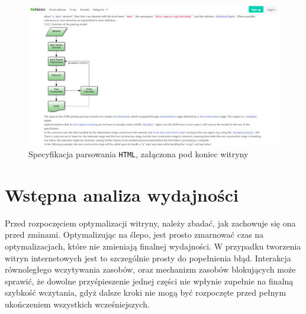 \documentclass[licencjacka]{pracadypl}
\begin{document}
\begin{figure}[H]
  \includegraphics[width=\linewidth]{images/frontpage-spec.png}
  \caption{Specyfikacja parsowania \texttt{HTML}, załączona pod koniec witryny}
  \label{fig:frontpage-spec}
\end{figure}




\section{Wstępna analiza wydajności}
Przed rozpoczęciem optymalizacji witryny, należy zbadać, jak zachowuje się ona przed zminami. Optymalizując na ślepo, jest prosto zmarnować czas na optymalizacjach, które nie zmieniają finalnej wydajności. W przypadku tworzenia witryn internetowych jest to szczególnie prosty do popełnienia błąd. Interakcja równoległego wczytywania zasobów, oraz mechanizm zasobów blokujących może sprawić, że dowolne przyśpieszenie jednej części nie wpłynie zupełnie na finalną szybkość wczytania, gdyż dalsze kroki nie mogą być rozpoczęte przed pełnym ukończeniem wszystkich wcześniejszych.
\end{document}
